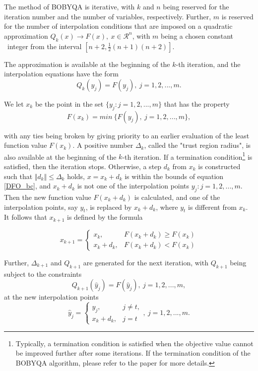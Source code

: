 \documentclass  [
  paper    = a4,
  BCOR     = 10mm,
  twoside,
  fontsize = 12pt,
  fleqn,
  toc      = bibnumbered,
  toc      = listofnumbered,
  numbers  = noendperiod,
  headings = normal,
  listof   = leveldown,
  version  = 3.03
]                                       {scrreprt}
\newcommand{\<}{\langle}
\renewcommand{\>}{\rangle}
\begin{document}
The method of BOBYQA is iterative, with $k$ and $n$ being reserved for the iteration number and the number of variables, respectively. Further, $m$ is reserved for the number of interpolation conditions that are imposed on a quadratic approximation $Q_k(x) \xrightarrow{} F(x), \ x \in  \mathcal{R}^n$, with $m$ being a chosen constant  integer from the interval $[n+2, \frac{1}{2}(n+1)(n+2)]$. 

The approximation is available at the beginning of the $k$-th iteration, and the interpolation equations have the form
\begin{equation}
	Q_k(y_j)= F(y_j),\   j = 1, 2, ..., m.
\end{equation}

We let $x_k$ be the point in the set $\{y_j : j = 1, 2, ... , m\}$ that has the property
\begin{equation}
	F(x_k)= min\ \{F(y_j), \  j = 1, 2, ..., m\}, 
\end{equation}

with any ties being broken by giving priority to an earlier evaluation of the least function value $F(x_k)$. A positive number $\Delta_k$, called the "trust region radius", is also available at the beginning of the $k$-th iteration. If a termination condition\footnote{Typically, a termination condition is satisfied when the objective value cannot be improved further after some iterations. If the termination condition of the BOBYQA algorithm, please refer to the paper \cite{MicPow09} for more details.} is satisfied, then the iteration stops. Otherwise, a step $d_k$ from $x_k$ is constructed such that $ \Vert d_k \Vert \leq \Delta_k $ holds, $x = x_k+d_k$ is within the bounds of equation \ref{DFO_bc}, and $x_k+d_k$ is not one of the interpolation points $y_j : j = 1, 2, ... , m$. Then the new function value $F(x_k+d_k)$ is calculated, and one of the interpolation points, say $y_t$, is replaced by $x_k+d_k$, where $y_t$ is different from $x_k$. It follows that $x_{k+1}$ is defined by the formula

\begin{equation}
	x_{k+1} =
	\begin{cases}
		x_k, & F(x_k+d_k) \geq F(x_k) \\
		x_k+d_k  , & F(x_k+d_k) < F(x_k) 
	\end{cases}
\end{equation}

Further, $\Delta_{k+1}$ and $Q_{k+1}$ are generated for the next iteration, with $Q_{k+1}$ being subject to the constraints
\begin{equation}
	Q_{k+1}(\hat{y}_j)= F(\hat{y}_j), \  j = 1, 2, ..., m, 
\end{equation}
at the new interpolation points
\begin{equation}
	\hat{y}_j =
	\begin{cases}
		y_j, & j \neq t, \\
		x_k+d_k  , & j =t 
	\end{cases},  \  j = 1, 2, ..., m.
\end{equation}
\end{document}
